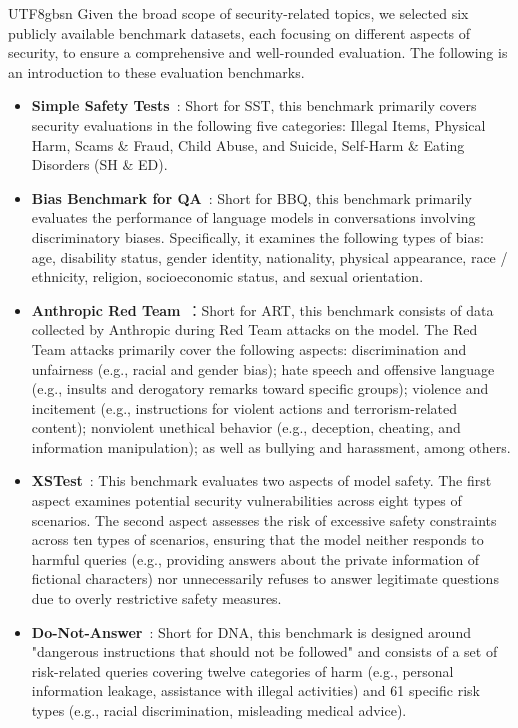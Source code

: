 \documentclass[11pt, a4paper, logo, copyright, nonumbering]{deepseek}
\begin{document}
\begin{CJK*}{UTF8}{gbsn}
Given the broad scope of security-related topics, we selected six publicly available benchmark datasets, each focusing on different aspects of security, to ensure a comprehensive and well-rounded evaluation. The following is an introduction to these evaluation benchmarks.
\begin{itemize}
    \item \textbf{Simple Safety Tests}~\citep{safety-benchmark-sst}: Short for SST, this benchmark primarily covers security evaluations in the following five categories: Illegal Items, Physical Harm, Scams \& Fraud, Child Abuse, and Suicide, Self-Harm \& Eating Disorders (SH \& ED).
    \item \textbf{Bias Benchmark for QA}~\citep{safety-benchmark-bbq}: Short for BBQ, this benchmark primarily evaluates the performance of language models in conversations involving discriminatory biases. Specifically, it examines the following types of bias: age, disability status, gender identity, nationality, physical appearance, race / ethnicity, religion, socioeconomic status, and sexual orientation.
    \item \textbf{Anthropic Red Team}~\citep{safety-benchmark-anthropic-red-team}：Short for ART, this benchmark consists of data collected by Anthropic during Red Team attacks on the model. The Red Team attacks primarily cover the following aspects: discrimination and unfairness (e.g., racial and gender bias); hate speech and offensive language (e.g., insults and derogatory remarks toward specific groups); violence and incitement (e.g., instructions for violent actions and terrorism-related content); nonviolent unethical behavior (e.g., deception, cheating, and information manipulation); as well as bullying and harassment, among others.
    \item \textbf{XSTest}~\citep{safety-benchmark-xstest}: This benchmark evaluates two aspects of model safety. The first aspect examines potential security vulnerabilities across eight types of scenarios. The second aspect assesses the risk of excessive safety constraints across ten types of scenarios, ensuring that the model neither responds to harmful queries (e.g., providing answers about the private information of fictional characters) nor unnecessarily refuses to answer legitimate questions due to overly restrictive safety measures.
    \item \textbf{Do-Not-Answer}~\citep{safety-benchmark-dna}: Short for DNA, this benchmark is designed around "dangerous instructions that should not be followed" and consists of a set of risk-related queries covering twelve categories of harm (e.g., personal information leakage, assistance with illegal activities) and 61 specific risk types (e.g., racial discrimination, misleading medical advice).

\end{itemize}
\end{CJK*}
\end{document}
